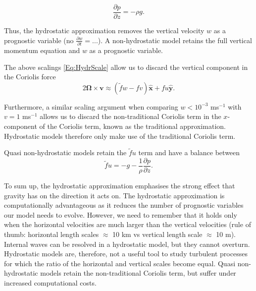 \begin{equation}
\frac{\partial p}{\partial z} = - \rho g.
\end{equation}


Thus, the hydrostatic approximation removes the vertical velocity $w$ as a prognostic variable (no $\frac{\partial w}{\partial t} = ...$). A non-hydrostatic model retains the full vertical momentum equation and $w$ as a prognostic variable. 

The above scalings \ref{Eq:HydrScale} allow us to discard the vertical component in the Coriolis force
\begin{equation}
2\boldsymbol{\Omega} \times \boldsymbol{v} \approx (\tilde{f}w - fv)\hat{\boldsymbol{x}}  + fu \hat{\boldsymbol{y} } .
\end{equation}

Furthermore, a similar scaling argument when comparing $w< 10^{-3}$ ms$^{-1}$ with $v=1$ ms$^{-1}$ allows us to discard the non-traditional Coriolis term in the $x$-component of the Coriolis term, known as the traditional approximation. Hydrostatic models therefore only make use of the traditional Coriolis term.

Quasi non-hydrostatic models retain the $\tilde{f}u$ term and have a balance between
\begin{equation}
\tilde{f}u = -g -\frac{1}{\rho}\frac{\partial p}{\partial z}.
\end{equation}

To sum up, the hydrostatic approximation emphasises the strong effect that gravity has on the direction it acts on. The hydrostatic approximation is computationally advantageous as it reduces the number of prognostic variables our model needs to evolve. However, we need to remember that it holds only when the horizontal velocities are much larger than the vertical velocities (rule of thumb: horizontal length scales $\approx$ 10 km vs vertical length scale $\approx$ 10 m). Internal waves can be resolved in a hydrostatic model, but they cannot overturn. Hydrostatic models are, therefore, not a useful tool to study turbulent processes for which the ratio of the horizontal and vertical scales become equal. Quasi non-hydrostatic models retain the non-traditional Coriolis term, but suffer under increased computational costs.

